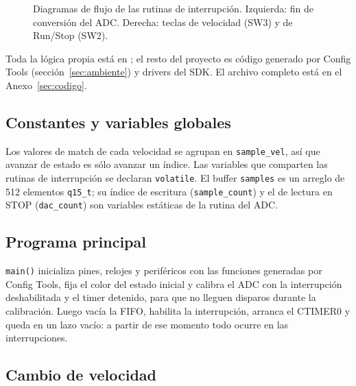 \documentclass[11pt,a4paper]{article}
\begin{document}
\begin{figure}[H]
\caption{Diagramas de flujo de las rutinas de interrupción. Izquierda: fin
de conversión del ADC. Derecha: teclas de velocidad (SW3) y de Run/Stop (SW2).}
\label{fig:flujo}
\end{figure}

\label{sec:implementacion}

Toda la lógica propia está en ; el resto del proyecto
es código generado por Config Tools (sección~\ref{sec:ambiente}) y drivers del
SDK. El archivo completo está en el Anexo~\ref{sec:codigo}.

\subsection{Constantes y variables globales}

Los valores de match de cada velocidad se agrupan en \texttt{sample\_vel},
así que avanzar de estado es sólo avanzar un índice. Las variables que
comparten las rutinas de interrupción se declaran \texttt{volatile}. El buffer
\texttt{samples} es un arreglo de 512 elementos \texttt{q15\_t}; su índice de
escritura (\texttt{sample\_count}) y el de lectura en STOP
(\texttt{dac\_count}) son variables estáticas de la rutina del ADC.

\subsection{Programa principal}

\texttt{main()} inicializa pines, relojes y periféricos con las funciones
generadas por Config Tools, fija el color del estado inicial y calibra el ADC
con la interrupción deshabilitada y el timer detenido, para que no lleguen
disparos durante la calibración. Luego vacía la FIFO, habilita la
interrupción, arranca el CTIMER0 y queda en un lazo vacío: a partir de ese
momento todo ocurre en las interrupciones.

\subsection{Cambio de velocidad}
\end{document}
